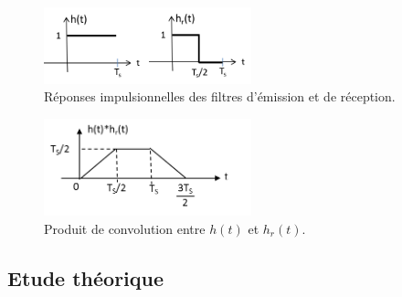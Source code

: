 \documentclass{article}
\begin{document}
\begin{figure}[ht!]
\centering
\includegraphics[width=6cm]{figure3.png}
\caption{Réponses impulsionnelles des filtres d'émission et de réception.}
 \label{rep_imp_ex1_2}
\end{figure}

\begin{figure}[ht!]
\centering
\includegraphics[width=6cm]{figure6.png}
\caption{Produit de convolution entre $h(t)$ et $h_r(t)$.}
\label{prod_conv}
\end{figure}

\subsection{Etude théorique}
\end{document}
